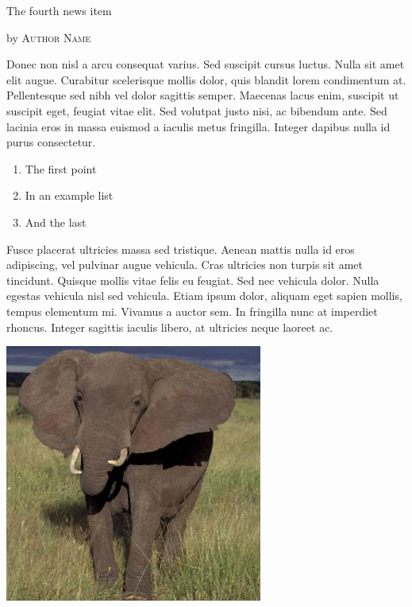 \documentclass[10pt,a4paper]{article} %
\newcommand{\NewsItem}[1]{ %
    \usefont{T1}{fvs}{n}{n} %
    \vspace{24pt}\large #1\vspace{3pt} %
    \par \normalsize \normalfont}
\newcommand{\NewsAuthor}[1]{ %
    \hfill by \textsc{#1} \vspace{20pt} %
    \par \normalfont}
\begin{document}
\begin{multicols}{3}

    \NewsItem{The fourth news item}
    \NewsAuthor{Author Name}

    Donec non nisl a arcu consequat varius. Sed suscipit cursus luctus. Nulla sit
    amet elit augue. Curabitur scelerisque mollis dolor, quis blandit lorem
    condimentum at. Pellentesque sed nibh vel dolor sagittis semper. Maecenas lacus
    enim, suscipit ut suscipit eget, feugiat vitae elit. Sed volutpat justo nisi,
    ac bibendum ante. Sed lacinia eros in massa euismod a iaculis metus fringilla.
    Integer dapibus nulla id purus consectetur.

    \begin{enumerate}
        \item The first point
        \item In an example list
        \item And the last
    \end{enumerate}

    Fusce placerat ultricies massa sed tristique. Aenean mattis nulla id eros
    adipiscing, vel pulvinar augue vehicula. Cras ultricies non turpis sit amet
    tincidunt. Quisque mollis vitae felis eu feugiat. Sed nec vehicula dolor. Nulla
    egestas vehicula nisl sed vehicula. Etiam ipsum dolor, aliquam eget sapien
    mollis, tempus elementum mi. Vivamus a auctor sem. In fringilla nunc at
    imperdiet rhoncus. Integer sagittis iaculis libero, at ultricies neque laoreet
    ac.

    \begin{center}
        \includegraphics[width=0.8\linewidth]{elephant.jpg}
    \end{center}


\end{multicols}
\end{document}
